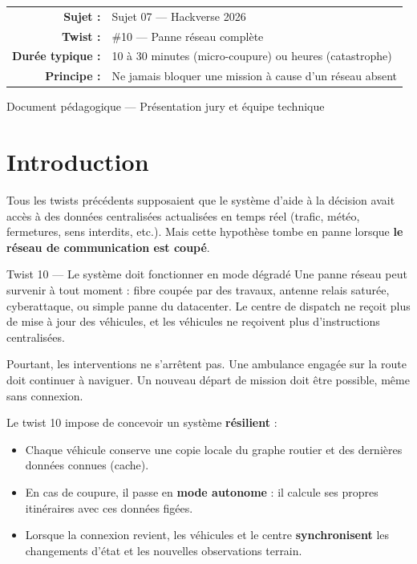 \documentclass[12pt,a4paper]{article}
\theoremstyle{definition}
\theoremstyle{remark}
\begin{document}
\begin{titlepage}
  \begin{tabular}{rl}
    \textbf{Sujet :}        & Sujet 07 — Hackverse 2026 \\
    \textbf{Twist :}        & \#10 — Panne réseau complète \\
    \textbf{Durée typique :} & 10 à 30 minutes (micro-coupure) ou heures (catastrophe) \\
    \textbf{Principe :}     & Ne jamais bloquer une mission à cause d’un réseau absent \\
  \end{tabular}

  \vfill
  {\small\color{gray} Document pédagogique — Présentation jury et équipe technique}
\end{titlepage}

\tableofcontents
\newpage

\section*{Introduction}

Tous les twists précédents supposaient que le système d’aide à la décision
avait accès à des données centralisées actualisées en temps réel
(trafic, météo, fermetures, sens interdits, etc.). Mais cette hypothèse
tombe en panne lorsque \textbf{le réseau de communication est coupé}.

\begin{twistbox}{Twist 10 — Le système doit fonctionner en mode dégradé}
Une panne réseau peut survenir à tout moment : fibre coupée par des travaux,
antenne relais saturée, cyberattaque, ou simple panne du datacenter.
Le centre de dispatch ne reçoit plus de mise à jour des véhicules, et
les véhicules ne reçoivent plus d’instructions centralisées.

Pourtant, les interventions ne s’arrêtent pas. Une ambulance engagée
sur la route doit continuer à naviguer. Un nouveau départ de mission
doit être possible, même sans connexion.

\medskip
Le twist 10 impose de concevoir un système \textbf{résilient} :
\begin{itemize}
  \item Chaque véhicule conserve une copie locale du graphe routier
        et des dernières données connues (cache).
  \item En cas de coupure, il passe en \textbf{mode autonome} :
        il calcule ses propres itinéraires avec ces données figées.
  \item Lorsque la connexion revient, les véhicules et le centre
        \textbf{synchronisent} les changements d’état et les nouvelles
        observations terrain.
\end{itemize}
\end{twistbox}
\end{document}
